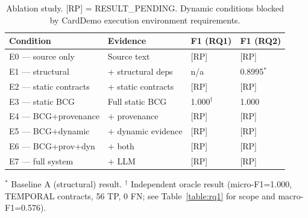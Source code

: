 \begin{table}[t]
\small
\centering
\caption{Ablation study. [RP] = RESULT\_PENDING. Dynamic conditions blocked by CardDemo execution environment requirements.}
\label{table:ablation}
\begin{tabular}{llll}
\toprule
Condition & Evidence & F1 (RQ1) & F1 (RQ2) \\
\midrule
E0 — source only & Source text & [RP] & [RP] \\
E1 — structural & + structural deps & n/a & 0.8995$^*$ \\
E2 — static contracts & + static contracts & [RP] & [RP] \\
E3 — static BCG & Full static BCG & 1.000$^\dagger$ & 1.000 \\
E4 — BCG+provenance & + provenance & [RP] & [RP] \\
E5 — BCG+dynamic & + dynamic evidence & [RP] & [RP] \\
E6 — BCG+prov+dyn & + both & [RP] & [RP] \\
E7 — full system & + LLM & [RP] & [RP] \\
\bottomrule
\end{tabular}
\vspace{0.3em}
{\small $^*$ Baseline A (structural) result. $^\dagger$ Independent oracle result (micro-F1=1.000, TEMPORAL contracts, 56 TP, 0 FN; see Table~\ref{table:rq1} for scope and macro-F1=0.576).}
\end{table}
